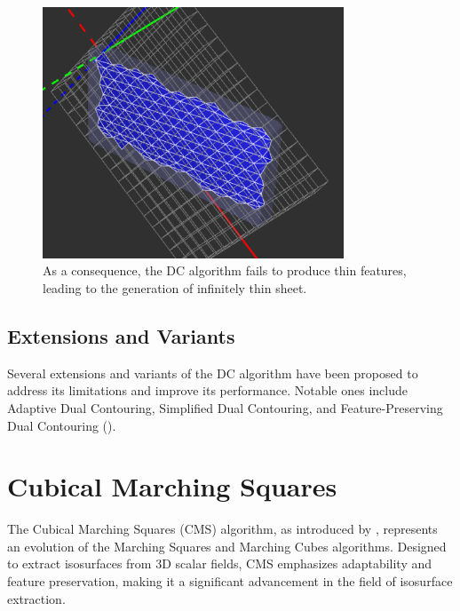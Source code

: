 \begin{itemize}
\begin{figure}
\centering
\includegraphics[height=0.7\textwidth, width=0.8\textwidth]{Figures/DC-thin-brick-mesh.png}
\decoRule
\caption{As a consequence, the DC algorithm fails to produce thin features, leading to the generation of infinitely thin sheet.}
\label{fig:DC-think-brick-mesh}
\end{figure}
\end{itemize}

\subsection{Extensions and Variants}

Several extensions and variants of the DC algorithm have been proposed to address its limitations and improve its performance. Notable ones include Adaptive Dual Contouring, Simplified Dual Contouring, and Feature-Preserving Dual Contouring (\cite{Zhang_2004}).

\section{Cubical Marching Squares} \label{Cubical-Marching-Squares}

The Cubical Marching Squares (CMS) algorithm, as introduced by \cite{Chien-Chang_2005}, represents an evolution of the Marching Squares and Marching Cubes algorithms. Designed to extract isosurfaces from 3D scalar fields, CMS emphasizes adaptability and feature preservation, making it a significant advancement in the field of isosurface extraction.

\vspace{2mm}
